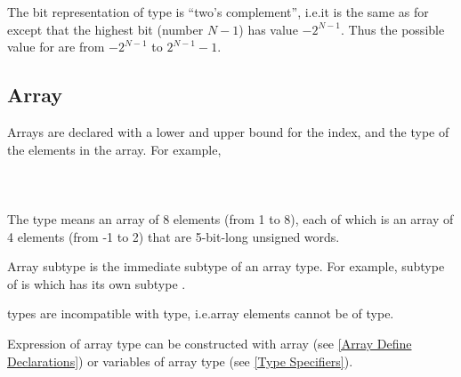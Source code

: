 The bit representation of \SWord[N] type is ``two's complement'',
i.e.\@ it is the same as for \UWord[N] except that the highest bit
(number $N-1$) has value $-2^{N-1}$. Thus the possible value for
\SWord[N] are from $-2^{N-1}$ to $2^{N-1}-1$.


\subsection{Array}
\label{Array Type}

Arrays are declared with a lower and upper bound for the index, and
the type of the elements in the array. For example,\\

\indent{}\\
\indent{}\\
\indent{}\\

The type  means an
array of 8 elements (from 1 to 8), each of which is an array of 4
elements (from -1 to 2) that are 5-bit-long unsigned words.

Array subtype is the immediate subtype of an array type. For example,
subtype of 
is  which has its own subtype 
\UWord[5].

\Array types are incompatible with \Set type, i.e.\@ array elements cannot 
be of \Set type.

Expression of array type can be constructed with array
 (see \ref{Array Define Declarations}) or variables of
array type (see \ref{Type Specifiers}).


% 
% 
% 
 
